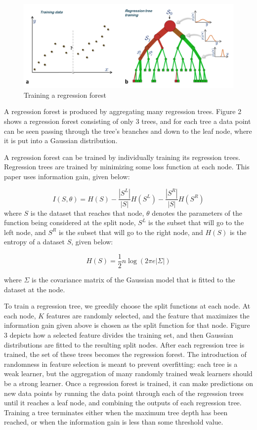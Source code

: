 \begin{figure}
\includegraphics[scale=0.45]{regressiontraining.png}
\caption{Training a regression forest}
\end{figure}

A regression forest is produced by aggregating many regression trees. Figure 2 shows a regression forest consisting of only 3 trees, and for each tree a data point can be seen passing through the tree's branches and down to the leaf node, where it is put into a Gaussian distribution.
  
A regression forest can be trained by individually training its regression trees. Regression trees are trained by minimizing some loss function at each node. This paper uses information gain, given below:

\begin{equation}
  I(S,\theta) = H(S) - \frac{|S^L|}{|S|} H(S^L) - \frac{|S^R|}{|S|} H(S^R)
\end{equation}
where $S$ is the dataset that reaches that node, $\theta$ denotes the parameters of the function being considered at the split node, $S^L$ is the subset that will go to the left node, and $S^R$ is the subset that will go to the right node, and $H(S)$ is the entropy of a dataset $S$, given below:

\begin{equation}
  H(S) = \frac{1}{2} n \log(2\pi e  |\Sigma|)
\end{equation}

where $\Sigma$ is the covariance matrix of the Gaussian model that is fitted to the dataset at the node.

To train a regression tree, we greedily choose the split functions at each node. At each node, $K$ features are randomly selected, and the feature that maximizes the information gain given above is chosen as the split function for that node. Figure 3 depicts how a selected feature divides the training set, and then Gaussian distributions are fitted to the resulting split nodes. After each regression tree is trained, the set of these trees becomes the regression forest. The introduction of randomness in feature selection is meant to prevent overfitting: each tree is a weak learner, but the aggregation of many randomly trained weak learners should be a strong learner. Once a regression forest is trained, it can make predictions on new data points by running the data point through each of the regression trees until it reaches a leaf node, and combining the outputs of each regression tree. Training a tree terminates either when the maximum tree depth has been reached, or when the information gain is less than some threshold value.

